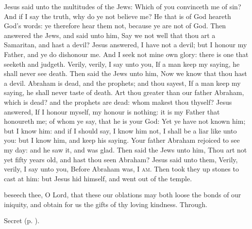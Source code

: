  Jesus said unto the multitudes of the Jews: Which of you convinceth me of sin? And if I say the truth, why do ye not believe me? He that is of God heareth God's words: ye therefore hear them not, because ye are not of God. Then answered the Jews, and said unto him, Say we not well that thou art a Samaritan, and hast a devil? Jesus answered, I have not a devil; but I honour my Father, and ye do dishonour me. And I seek not mine own glory: there is one that seeketh and judgeth. Verily, verily, I say unto you, If a man keep my saying, he shall never see death. Then said the Jews unto him, Now we know that thou hast a devil. Abraham is dead, and the prophets; and thou sayest, If a man keep my saying, he shall never taste of death. Art thou greater than our father Abraham, which is dead? and the prophets are dead: whom makest thou thyself? Jesus answered, If I honour myself, my honour is nothing: it is my Father that honoureth me; of whom ye say, that he is your God: Yet ye have not known him; but I know him: and if I should say, I know him not, I shall be a liar like unto you: but I know him, and keep his saying. Your father Abraham rejoiced to see my day: and he saw it, and was glad. Then said the Jews unto him, Thou art not yet fifty years old, and hast thou seen Abraham? Jesus said unto them, Verily, verily, I say unto you, Before Abraham was, \textsc{I am}. Then took they up stones to cast at him: but Jesus hid himself, and went out of the temple.


\secret
{} beseech thee, O Lord, that these our oblations may both loose the bonds of our iniquity, and obtain for us the gifts of thy loving kindness. Through.

\begin{rubric}
     Secret  (p. \pageref{AshWednesdayMassSecret}).
\end{rubric}


